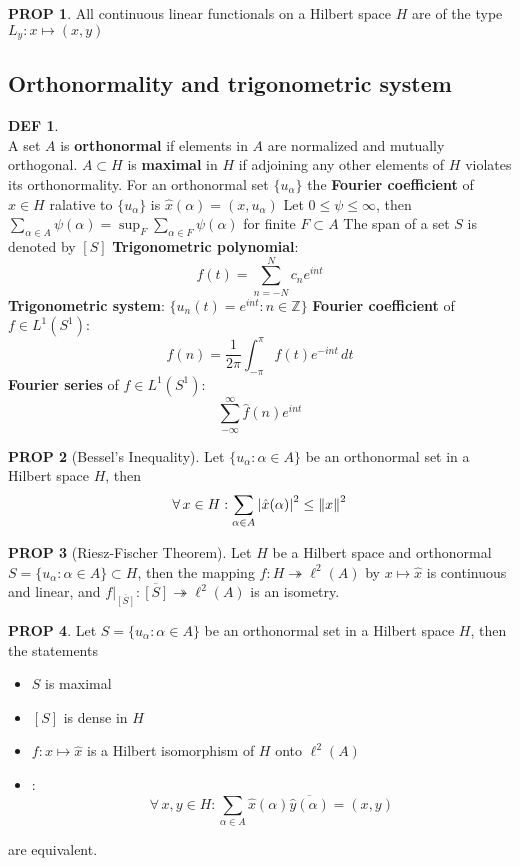 \documentclass[hidelinks,10pt]{article}
\theoremstyle{definition}
\newtheorem*{defin}{DEF}
\theoremstyle{dotles}
\theoremstyle{dotless}
\newtheorem{proposition}{PROP}[section]
\theoremstyle{remark}
\begin{document}
\begin{proposition}
All continuous linear functionals on a Hilbert space $H$ are of the type $L_y:x\mapsto(x,y)$
\end{proposition}

\subsection{Orthonormality and trigonometric system}

\begin{defin}~\\
A set $A$ is \textbf{orthonormal} if elements in $A$ are normalized and mutually orthogonal. $A\subset H$ is \textbf{maximal} in $H$ if adjoining any other elements of $H$ violates its orthonormality.\newline
For an orthonormal set $\{u_\alpha\}$ the \textbf{Fourier coefficient} of $x\in H$ ralative to $\{u_\alpha\}$ is $\hat{x}(\alpha)=(x,u_\alpha)$\bigbreak
Let $0\leq\psi\leq\infty$, then $\sum_{\alpha\in A}\psi(\alpha)=\sup_F\sum_{\alpha\in F}\psi(\alpha)$ for finite $F\subset A$\newline
The span of a set $S$ is denoted by $[S]$\bigbreak
\textbf{Trigonometric polynomial}:
\[f(t)=\sum_{n=-N}^Nc_ne^{int}\]\newline
\textbf{Trigonometric system}: $\{u_n(t)=e^{int}:n\in\mathbb{Z}\}$\newline
\textbf{Fourier coefficient} of $f\in L^1(S^1)$:
\[\hat{f}(n)=\frac{1}{2\pi}\int_{-\pi}^\pi f(t)e^{-int}\,dt\]
\textbf{Fourier series} of $f\in L^1(S^1)$:
\[\sum_{-\infty}^\infty\hat{f}(n)e^{int}\]
\end{defin}

\begin{proposition}[Bessel's Inequality]Let $\{u_\alpha:\alpha\in A\}$ be an orthonormal set in a Hilbert space $H$, then
\[\forall\,x\in H:\sum_{\alpha\in A}\abs{\hat{x}(\alpha)}^2\leq\norm{x}^2\]
\end{proposition}

\begin{proposition}[Riesz-Fischer Theorem]Let $H$ be a Hilbert space and orthonormal $S=\{u_\alpha:\alpha\in A\}\subset H$, then the mapping $f:H\twoheadrightarrow\ell^2(A)$ by $x\mapsto \hat{x}$ is continuous and linear, and $f|_{\overline{[S]}}:\overline{[S]}\twoheadrightarrow\ell^2(A)$ is an isometry.
\end{proposition}

\begin{proposition}
Let $S=\{u_\alpha:\alpha\in A\}$ be an orthonormal set in a Hilbert space $H$, then the statements\begin{itemize}
    \item $S$ is maximal
    \item $[S]$ is dense in $H$
    \item $f:x\mapsto\hat{x}$ is a Hilbert isomorphism of $H$ onto $\ell^2(A)$
    \item {}:
    \[\forall\,x,y\in H:\sum_{\alpha\in A}\hat{x}(\alpha)\overline{\hat{y}(\alpha)}=(x,y)\]
\end{itemize}
are equivalent.
\end{proposition}
\end{document}
